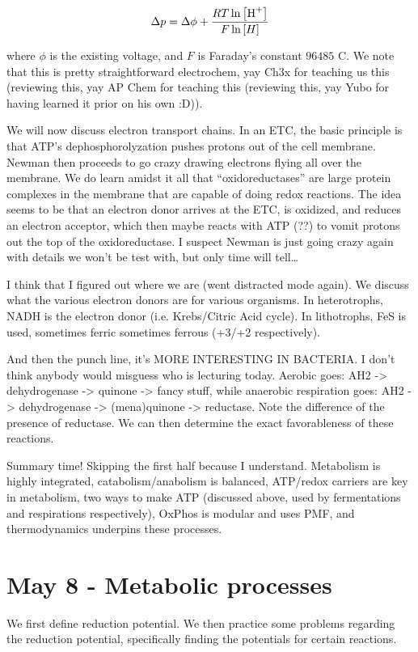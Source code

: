 \documentclass[12pt]{article}
\begin{document}
$$\Delta p = \Delta \phi + \frac{RT\ln\left[ \ce{H+} \right]}{F\ln\left[ H \right]}$$

where $\phi$ is the existing voltage, and $F$ is Faraday's constant $96485$ C. We note that this is pretty straightforward electrochem, yay Ch3x for teaching us this (reviewing this, yay AP Chem for teaching this (reviewing this, yay Yubo for having learned it prior on his own :D)).

We will now discuss electron transport chains. In an ETC, the basic principle is that ATP's dephosphorolyzation pushes protons out of the cell membrane. Newman then proceeds to go crazy drawing electrons flying all over the membrane. We do learn amidst it all that ``oxidoreductases'' are large protein complexes in the membrane that are capable of doing redox reactions. The idea seems to be that an electron donor arrives at the ETC, is oxidized, and reduces an electron acceptor, which then maybe reacts with ATP (??) to vomit protons out the top of the oxidoreductase. I suspect Newman is just going crazy again with details we won't be test with, but only time will tell\dots

I think that I figured out where we are (went distracted mode again). We discuss what the various electron donors are for various organisms. In heterotrophs, NADH is the electron donor (i.e. Krebs/Citric Acid cycle). In lithotrophs, FeS is used, sometimes ferric sometimes ferrous (+3/+2 respectively). 

And then the punch line, it's MORE INTERESTING IN BACTERIA. I don't think anybody would misguess who is lecturing today. Aerobic goes: AH2 -> dehydrogenase -> quinone -> fancy stuff, while anaerobic respiration goes: AH2 -> dehydrogenase -> (mena)quinone -> reductase. Note the difference of the presence of reductase. We can then determine the exact favorableness of these reactions. 

Summary time! Skipping the first half because I understand. Metabolism is highly integrated, catabolism/anabolism is balanced, ATP/redox carriers are key in metabolism, two ways to make ATP (discussed above, used by fermentations and respirations respectively), OxPhos is modular and uses PMF, and thermodynamics underpins these processes.
\section*{May 8 - Metabolic processes}

We first define reduction potential. We then practice some problems regarding the reduction potential, specifically finding the potentials for certain reactions. 
\end{document}
